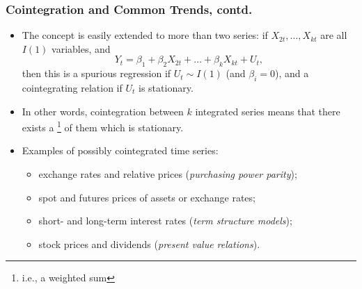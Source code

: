 \begin{frame}%

\frametitle{Cointegration and Common Trends, contd.}

\begin{itemize}
\item The concept is easily extended to more than two series: if $%
X_{2t},\ldots ,X_{kt}$ are all $I(1)$ variables, and
\begin{equation*}
Y_{t}=\beta _{1}+\beta _{2}X_{2t}+\ldots +\beta _{k}X_{kt}+U_{t},
\end{equation*}%
then this is a spurious regression if $U_{t}\sim I(1)$ (and $\beta _{i}=0$),
and a cointegrating relation if $U_{t}$ is stationary.
\item In other words, cointegration between $k$ integrated series means that there exists a \footnote{i.e., a weighted sum} of them which is stationary.
\item Examples of possibly cointegrated time series:

\begin{itemize}
\item exchange rates and relative prices (\emph{\color{red}purchasing power
parity});

\item spot and futures prices of assets or exchange rates;

\item short- and long-term interest rates (\emph{\color{red}term structure
models});

\item stock prices and dividends (\emph{\color{red}present value relations}).
\end{itemize}

\end{itemize}

\end{frame}%




